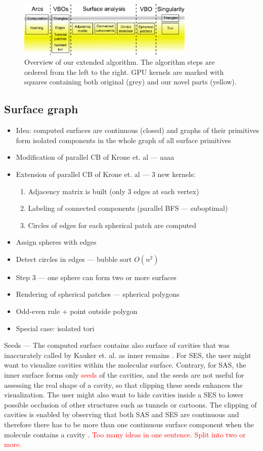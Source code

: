 \begin{figure}[htb]
  \centering
  \includegraphics[width=3.3in]{image/kernels.png}
  \caption{Overview of our extended algorithm.
	The algorithm steps are ordered from the left to the right.
	GPU kernels are marked with squares containing both original (grey) and our novel parts (yellow).}
	\label{fig:kernels}
\end{figure}

\subsection{Surface graph}
\begin{itemize}
  \item Idea: computed surfaces are continuous (closed) and graphs of their primitives form isolated components in the whole graph of all surface primitives
  \item Modification of parallel CB of Krone et. al --- aaaa
  \item Extension of parallel CB of Krone et. al --- 3 new kernels:
	\begin{enumerate}
	  \item Adjacency matrix is built (only 3 edges at each vertex)
    \item Labeling of connected components (parallel BFS --- suboptimal)
    \item Circles of edges for each spherical patch are computed
  \end{enumerate}
  \item Assign spheres with edges
  \item Detect circles in edges --- bubble sort $O(n^2)$
  \item Step 3 --- one sphere can form two or more surfaces
  \item Rendering of spherical patches --- spherical polygons
  \item Odd-even rule + point outside polygon
  \item Special case: isolated tori
\end{itemize}

Seeds --- The computed surface contains also surface of cavities that was inaccurately called by Kauker et. al. as inner remains \cite{kauker2013rendering}.
For SES, the user might want to visualize cavities within the molecular surface.
Contrary, for SAS, the inner surface forms only \textcolor{red}{seeds} of the cavities, and the seeds are not useful for assessing the real shape of a cavity, so that clipping these seeds enhances the visualization.
The user might also want to hide cavities inside a SES to lower possible occlusion of other structures such as tunnels or cartoons.
The clipping of cavities is enabled by observing that both SAS and SES are continuous and therefore there has to be more than one continuous surface component when the molecule contains a cavity \cite{borland2011ambient}.
\textcolor{red}{Too many ideas in one sentence. Split into two or more.}

